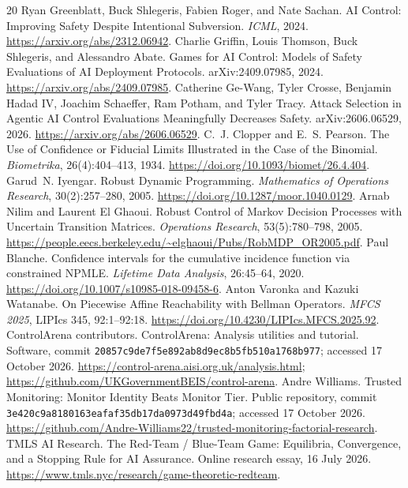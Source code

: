 \documentclass[10pt]{article}
\begin{document}
\begin{thebibliography}{20}
 Ryan Greenblatt, Buck Shlegeris, Fabien Roger, and Nate Sachan. AI Control: Improving Safety Despite Intentional Subversion. \emph{ICML}, 2024. \url{https://arxiv.org/abs/2312.06942}.
 Charlie Griffin, Louis Thomson, Buck Shlegeris, and Alessandro Abate. Games for AI Control: Models of Safety Evaluations of AI Deployment Protocols. arXiv:2409.07985, 2024. \url{https://arxiv.org/abs/2409.07985}.
 Catherine Ge-Wang, Tyler Crosse, Benjamin Hadad IV, Joachim Schaeffer, Ram Potham, and Tyler Tracy. Attack Selection in Agentic AI Control Evaluations Meaningfully Decreases Safety. arXiv:2606.06529, 2026. \url{https://arxiv.org/abs/2606.06529}.
 C.~J. Clopper and E.~S. Pearson. The Use of Confidence or Fiducial Limits Illustrated in the Case of the Binomial. \emph{Biometrika}, 26(4):404--413, 1934. \url{https://doi.org/10.1093/biomet/26.4.404}.
 Garud~N. Iyengar. Robust Dynamic Programming. \emph{Mathematics of Operations Research}, 30(2):257--280, 2005. \url{https://doi.org/10.1287/moor.1040.0129}.
 Arnab Nilim and Laurent El Ghaoui. Robust Control of Markov Decision Processes with Uncertain Transition Matrices. \emph{Operations Research}, 53(5):780--798, 2005. \url{https://people.eecs.berkeley.edu/~elghaoui/Pubs/RobMDP_OR2005.pdf}.
 Paul Blanche. Confidence intervals for the cumulative incidence function via constrained NPMLE. \emph{Lifetime Data Analysis}, 26:45--64, 2020. \url{https://doi.org/10.1007/s10985-018-09458-6}.
 Anton Varonka and Kazuki Watanabe. On Piecewise Affine Reachability with Bellman Operators. \emph{MFCS 2025}, LIPIcs 345, 92:1--92:18. \url{https://doi.org/10.4230/LIPIcs.MFCS.2025.92}.
 ControlArena contributors. ControlArena: Analysis utilities and tutorial. Software, commit \texttt{20857c9de7f5e892ab8d9ec8b5fb510a1768b977}; accessed 17 October 2026. \url{https://control-arena.aisi.org.uk/analysis.html}; \url{https://github.com/UKGovernmentBEIS/control-arena}.
 Andre Williams. Trusted Monitoring: Monitor Identity Beats Monitor Tier. Public repository, commit \texttt{3e420c9a8180163eafaf35db17da0973d49fbd4a}; accessed 17 October 2026. \url{https://github.com/Andre-Williams22/trusted-monitoring-factorial-research}.
 TMLS AI Research. The Red-Team / Blue-Team Game: Equilibria, Convergence, and a Stopping Rule for AI Assurance. Online research essay, 16 July 2026. \url{https://www.tmls.nyc/research/game-theoretic-redteam}.
\end{thebibliography}
\end{document}
